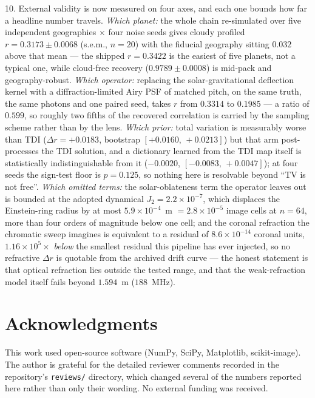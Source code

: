 \documentclass[twocolumn,10pt]{article}
\newcommand{\acknowledgments}{\section*{Acknowledgments}}
\begin{document}
10. External validity is now measured on four axes, and each one bounds how far a
headline number travels. \emph{Which planet:} the whole chain re-simulated over
five independent geographies $\times$ four noise seeds gives cloudy profiled
$r=0.3173\pm0.0068$ (s.e.m., $n=20$) with the fiducial geography sitting $0.032$
above that mean --- the shipped $r=0.3422$ is the easiest of five planets, not a
typical one, while cloud-free recovery ($0.9789\pm0.0008$) is mid-pack and
geography-robust. \emph{Which operator:} replacing the solar-gravitational
deflection kernel with a diffraction-limited Airy PSF of matched pitch, on the
same truth, the same photons and one paired seed, takes $r$ from $0.3314$ to
$0.1985$ --- a ratio of $0.599$, so roughly two fifths of the recovered
correlation is carried by the sampling scheme rather than by the lens.
\emph{Which prior:} total variation is measurably worse than TDI
($\Delta r=+0.0183$, bootstrap $[+0.0160,\,+0.0213]$) but that arm post-processes
the TDI solution, and a dictionary learned from the TDI map itself is statistically
indistinguishable from it ($-0.0020$, $[-0.0083,\,+0.0047]$); at four seeds the
sign-test floor is $p=0.125$, so nothing here is resolvable beyond ``TV is not
free''. \emph{Which omitted terms:} the solar-oblateness term the operator leaves
out is bounded at the adopted dynamical $J_2=2.2\times10^{-7}$, which displaces
the Einstein-ring radius by at most $5.9\times10^{-4}$~m $=2.8\times10^{-5}$ image
cells at $n=64$, more than four orders of magnitude below one cell; and the coronal
refraction the chromatic sweep imagines is equivalent to a residual of
$8.6\times10^{-14}$ coronal units, $1.16\times10^{5}\times$ \emph{below} the
smallest residual this pipeline has ever injected, so no refractive $\Delta r$ is
quotable from the archived drift curve --- the honest statement is that optical
refraction lies outside the tested range, and that the weak-refraction model
itself fails beyond $1.594$~m ($188$~MHz).

\acknowledgments
This work used open-source software (NumPy, SciPy, Matplotlib, scikit-image).
The author is grateful for the detailed reviewer comments recorded in the
repository's {\tt reviews/} directory, which changed several of the numbers
reported here rather than only their wording.  No external funding was
received.
\end{document}

